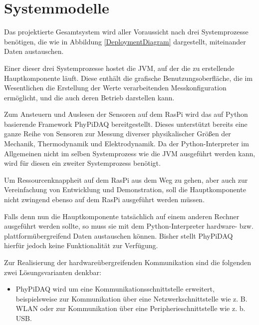 \documentclass[parskip=full]{scrartcl}
\begin{document}
\clearpage
\section{Systemmodelle}\label{systemmodell}

Das projektierte Gesamtsystem wird aller Voraussicht nach drei Systemprozesse benötigen, die wie in Abbildung \ref{DeploymentDiagram} dargestellt, miteinander Daten austauschen.

Einer dieser drei Systemprozesse hostet die \gls{JVM}, auf der die zu erstellende Hauptkomponente läuft. Diese enthält die grafische Benutzungsoberfläche, die im Wesentlichen die Erstellung der Werte verarbeitenden Messkonfiguration ermöglicht, und die auch deren Betrieb darstellen kann. 

Zum Ansteuern und Auslesen der Sensoren auf dem \gls{RasPi} wird das auf Python basierende Framework \gls{PhyPiDAQ} bereitgestellt. Dieses unterstützt bereits eine  ganze Reihe von Sensoren zur Messung diverser physikalischer Größen der Mechanik, Thermodynamik und Elektrodynamik. Da der Python-Interpreter im Allgemeinen nicht im selben Systemprozess wie die \gls{JVM} ausgeführt werden kann, wird für diesen ein zweiter Systemprozess benötigt.

Um Ressourcenknappheit auf dem \gls{RasPi} aus dem Weg zu gehen, aber auch zur Vereinfachung von Entwicklung und Demonstration, soll die Hauptkomponente nicht zwingend ebenso auf dem \gls{RasPi} ausgeführt werden müssen. 

Falls denn nun die Hauptkomponente tatsächlich auf einem anderen Rechner ausgeführt werden sollte, so muss sie mit dem Python-Interpreter hardware- bzw. plattformübergreifend Daten austauschen können. Bisher stellt PhyPiDAQ hierfür jedoch keine Funktionalität zur Verfügung.

Zur Realisierung der hardwareübergreifenden Kommunikation sind die folgenden zwei Lösungsvarianten denkbar: 

\begin{itemize}


	\item PhyPiDAQ wird um eine Kommunikationsschnittstelle erweitert, beispielsweise zur Kommunikation über eine Netzwerkschnittstelle wie z. B. WLAN oder zur Kommunikation über eine Peripherieschnittstelle wie z. b. USB.
	

\end{itemize}
\end{document}
